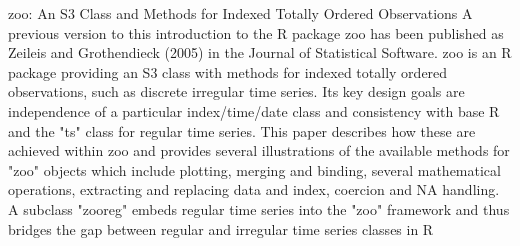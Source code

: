 zoo: An S3 Class and Methods for Indexed Totally Ordered Observations
A previous version to this introduction to the R package zoo has been published as
Zeileis and Grothendieck (2005) in the Journal of Statistical Software.
zoo is an R package providing an S3 class with methods for indexed totally ordered
observations, such as discrete irregular time series. Its key design goals are independence
of a particular index/time/date class and consistency with base R and the "ts" class for
regular time series. This paper describes how these are achieved within zoo and provides
several illustrations of the available methods for "zoo" objects which include plotting,
merging and binding, several mathematical operations, extracting and replacing data and
index, coercion and NA handling. A subclass "zooreg" embeds regular time series into
the "zoo" framework and thus bridges the gap between regular and irregular time series
classes in R
